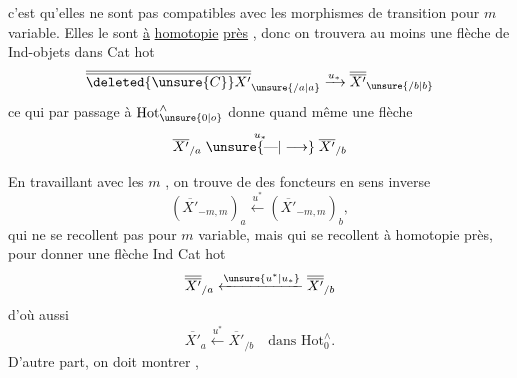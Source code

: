  c'est qu'elles ne sont pas compatibles avec les morphismes de transition pour $m$ variable. Elles le sont  \uline{à} \uline{homotopie} \uline{près} , donc on trouvera au moins une flèche de Ind-objets dans Cat hot
\[
\overline{\overline{\deleted{\unsure{C}}X'}}_{\unsure{/a|a}}\xrightarrow{u_*}
\overline{\overline{X'}}_{\unsure{/b|b}}
\]
ce qui par passage à $\mathrm{Hot}_{\unsure{0|o}}^{\wedge}$ donne quand même une flèche
\[
\overline{X'}_{/a}\mathrel{\overset{u_*}{\unsure{\text{---}|\longrightarrow}}}\overline{X'}_{/b}
\]

En travaillant avec les $m$ , on trouve de  des foncteurs en sens inverse
\[
(\overline{X'}_{-m,m})_a\xleftarrow{u^*}(\overline{X'}_{-m,m})_b,
\]
qui ne se recollent pas pour $m$ variable, mais qui se recollent à homotopie près, pour donner une flèche  Ind Cat hot
\[
\overline{\overline{X'}}_{/a}\xleftarrow{\unsure{u^*|u_*}}\overline{\overline{X'}}_{/b}
\]
d'où aussi
\[
\overline{X'}_{a}\xleftarrow{u^*}\overline{X'}_{/b}\quad\text{dans }\mathrm{Hot}_0^{\wedge}.
\]
D'autre part, on doit  montrer ,
